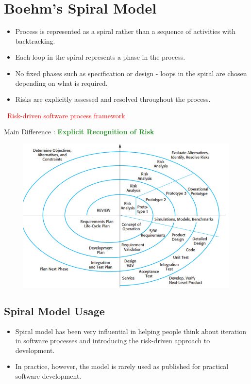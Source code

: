 \documentclass{report}
\newcommand{\textr}[1]{\textcolor{red}{#1}}
\newcommand{\textg}[1]{\textcolor{ForestGreen}{#1}}
\newcommand{\textbfg}[1]{\textbf{\textg{#1}}}
\begin{document}
\section{Boehm's Spiral Model}
\vspace{-1em}
\begin{multicols}{2}
\begin{itemize}
  \item Process is represented as a spiral rather than a sequence of activities with backtracking.
  \item Each loop in the spiral represents a phase in the process.
  \item No fixed phases such as specification or design - loops in the spiral are chosen depending on what is required.
  \item Risks are explicitly assessed and resolved throughout the process.
\end{itemize} \
\textr{Risk-driven software process framework}

\noindent Main Difference : \textbfg{Explicit Recognition of Risk} \newline
\columnbreak
\begin{figure}[H]
\centering
\includegraphics[scale=.35,trim=1cm 1cm 1cm 1cm]{assets/CEN4010_Spiral_Model.jpg}
\end{figure}
\end{multicols}

\vspace{-2em}
\subsection{Spiral Model Usage}
\begin{itemize}
  \item Spiral model has been very influential in helping people think about iteration in software processes and introducing the risk-driven approach to development.
  \item In practice, however, the model is rarely used as published for practical software development.
\end{itemize}
\end{document}
